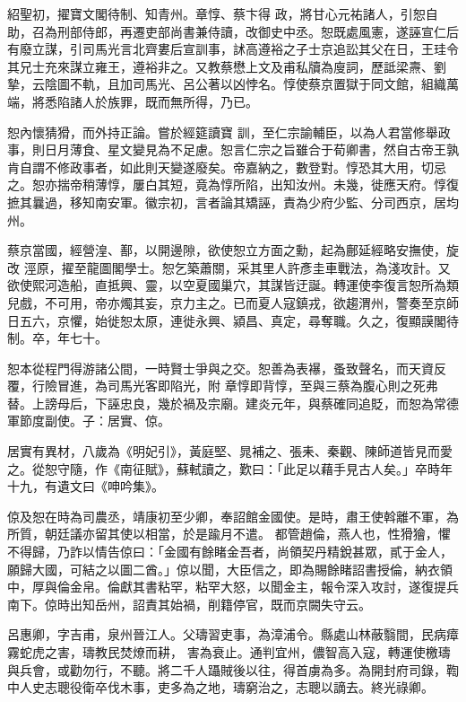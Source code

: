 \begin{pinyinscope}
 紹聖初，擢寶文閣待制、知青州。章惇、蔡卞得
 政，將甘心元祐諸人，引恕自助，召為刑部侍郎，再遷吏部尚書兼侍讀，改御史中丞。恕既處風憲，遂誣宣仁后有廢立謀，引司馬光言北齊婁后宣訓事，訹高遵裕之子士京追訟其父在日，王珪令其兄士充來謀立雍王，遵裕非之。又教蔡懋上文及甫私牘為廋詞，歷詆梁燾、劉摯，云陰圖不軌，且加司馬光、呂公著以凶悖名。惇使蔡京置獄于同文館，組織萬端，將悉陷諸人於族罪，既而無所得，乃已。



 恕內懷猜猾，而外持正論。嘗於經筵讀寶
 訓，至仁宗諭輔臣，以為人君當修舉政事，則日月薄食、星文變見為不足慮。恕言仁宗之旨雖合于荀卿書，然自古帝王孰肯自謂不修政事者，如此則天變遂廢矣。帝嘉納之，數登對。惇恐其大用，切忌之。恕亦揣帝稍薄惇，屢白其短，竟為惇所陷，出知汝州。未幾，徙應天府。惇復摭其曩過，移知南安軍。徽宗初，言者論其矯誣，責為少府少監、分司西京，居均州。



 蔡京當國，經營湟、鄯，以開邊隙，欲使恕立方面之勳，起為鄜延經略安撫使，旋改
 涇原，擢至龍圖閣學士。恕乞築蕭關，采其里人許彥圭車戰法，為淺攻計。又欲使熙河造船，直抵興、靈，以空夏國巢穴，其謀皆迂誕。轉運使李復言恕所為類兒戲，不可用，帝亦燭其妄，京力主之。已而夏人寇鎮戎，欲趨渭州，警奏至京師日五六，京懼，始徙恕太原，連徙永興、潁昌、真定，尋奪職。久之，復顯謨閣待制。卒，年七十。



 恕本從程門得游諸公間，一時賢士爭與之交。恕善為表襮，蚤致聲名，而天資反覆，行險冒進，為司馬光客即陷光，附
 章惇即背惇，至與三蔡為腹心則之死弗替。上謗母后，下誣忠良，幾於禍及宗廟。建炎元年，與蔡確同追貶，而恕為常德軍節度副使。子：居實、倞。



 居實有異材，八歲為《明妃引》，黃庭堅、晁補之、張耒、秦觀、陳師道皆見而愛之。從恕守隨，作《南征賦》，蘇軾讀之，歎曰：「此足以藉手見古人矣。」卒時年十九，有遺文曰《呻吟集》。



 倞及恕在時為司農丞，靖康初至少卿，奉詔館金國使。是時，肅王使斡離不軍，為所質，朝廷議亦留其使以相當，於是踰月不遣。
 都管趙倫，燕人也，性猾獪，懼不得歸，乃詐以情告倞曰：「金國有餘睹金吾者，尚領契丹精銳甚眾，貳于金人，願歸大國，可結之以圖二酋。」倞以聞，大臣信之，即為賜餘睹詔書授倫，納衣領中，厚與倫金帛。倫獻其書粘罕，粘罕大怒，以聞金主，報令深入攻討，遂復提兵南下。倞時出知岳州，詔責其始禍，削籍停官，既而京闕失守云。



 呂惠卿，字吉甫，泉州晉江人。父璹習吏事，為漳浦令。縣處山林蔽翳間，民病瘴霧蛇虎之害，璹教民焚燎而耕，
 害為衰止。通判宜州，儂智高入寇，轉運使檄璹與兵會，或勸勿行，不聽。將二千人躡賊後以往，得首虜為多。為開封府司錄，鞫中人史志聰役衛卒伐木事，吏多為之地，璹窮治之，志聰以謫去。終光祿卿。




\end{pinyinscope}
